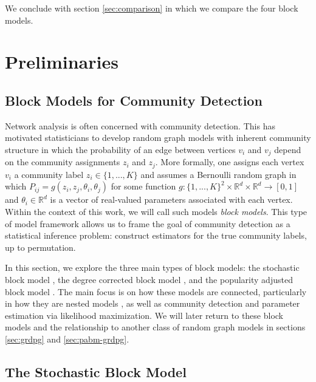 \documentclass[
  12pt,
]{article}
\theoremstyle{definition}
\theoremstyle{definition}
\theoremstyle{definition}
\theoremstyle{definition}
\theoremstyle{remark}
\begin{document}
We conclude with section \ref{sec:comparison} in which we compare the four block models.

\newpage

\hypertarget{preliminaries}{%
\section{Preliminaries}\label{preliminaries}}

\hypertarget{sec:blockmodel}{%
\subsection{Block Models for Community Detection}\label{sec:blockmodel}}

Network analysis is often concerned with community detection.
This has motivated statisticians to develop random graph models with inherent community structure in which the probability of an edge between vertices \(v_i\) and \(v_j\) depend on the community assignments \(z_i\) and \(z_j\).
More formally, one assigns each vertex \(v_i\) a community label \(z_i \in \{1, ..., K\}\) and assumes a Bernoulli random graph in which \(P_{ij} = g(z_i, z_j, \theta_i, \theta_j)\) for some function \(g: \{1, ..., K\}^2 \times \mathbb{R}^d \times \mathbb{R}^d \to [0, 1]\) and \(\theta_i \in \mathbb{R}^d\) is a vector of real-valued parameters associated with each vertex.
Within the context of this work, we will call such models \emph{block models}.
This type of model framework allows us to frame the goal of community detection as a statistical inference problem:
construct estimators for the true community labels, up to permutation.

In this section, we explore the three main types of block models:
the stochastic block model \citep{doi:10.1080/0022250X.1971.9989788}, the degree corrected block model \citep{Karrer_2011}, and the popularity adjusted block model \citep{307cbeb9b1be48299388437423d94bf1}.
The main focus is on how these models are connected, particularly in how they are nested models \citep{Noroozi2022}, as well as community detection and parameter estimation via likelihood maximization.
We will later return to these block models and the relationship to another class of random graph models in sections \ref{sec:grdpg} and \ref{sec:pabm-grdpg}.

\hypertarget{sec:sbm}{%
\subsection{The Stochastic Block Model}\label{sec:sbm}}
\end{document}

